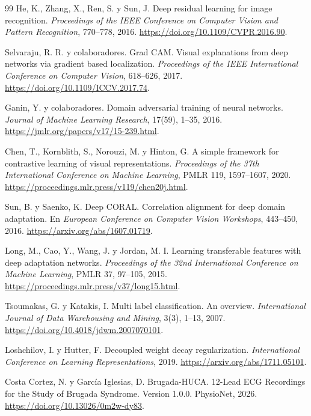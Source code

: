\begin{thebibliography}{99}
He, K., Zhang, X., Ren, S. y Sun, J.
\newblock Deep residual learning for image recognition.
\newblock \emph{Proceedings of the IEEE Conference on Computer Vision and Pattern Recognition}, 770--778, 2016.
\newblock \url{https://doi.org/10.1109/CVPR.2016.90}.

Selvaraju, R. R. y colaboradores.
\newblock Grad CAM. Visual explanations from deep networks via gradient based localization.
\newblock \emph{Proceedings of the IEEE International Conference on Computer Vision}, 618--626, 2017.
\newblock \url{https://doi.org/10.1109/ICCV.2017.74}.

Ganin, Y. y colaboradores.
\newblock Domain adversarial training of neural networks.
\newblock \emph{Journal of Machine Learning Research}, 17(59), 1--35, 2016.
\newblock \url{https://jmlr.org/papers/v17/15-239.html}.

Chen, T., Kornblith, S., Norouzi, M. y Hinton, G.
\newblock A simple framework for contrastive learning of visual representations.
\newblock \emph{Proceedings of the 37th International Conference on Machine Learning}, PMLR 119, 1597--1607, 2020.
\newblock \url{https://proceedings.mlr.press/v119/chen20j.html}.

Sun, B. y Saenko, K.
\newblock Deep CORAL. Correlation alignment for deep domain adaptation.
\newblock En \emph{European Conference on Computer Vision Workshops}, 443--450, 2016.
\newblock \url{https://arxiv.org/abs/1607.01719}.

Long, M., Cao, Y., Wang, J. y Jordan, M. I.
\newblock Learning transferable features with deep adaptation networks.
\newblock \emph{Proceedings of the 32nd International Conference on Machine Learning}, PMLR 37, 97--105, 2015.
\newblock \url{https://proceedings.mlr.press/v37/long15.html}.

Tsoumakas, G. y Katakis, I.
\newblock Multi label classification. An overview.
\newblock \emph{International Journal of Data Warehousing and Mining}, 3(3), 1--13, 2007.
\newblock \url{https://doi.org/10.4018/jdwm.2007070101}.

Loshchilov, I. y Hutter, F.
\newblock Decoupled weight decay regularization.
\newblock \emph{International Conference on Learning Representations}, 2019.
\newblock \url{https://arxiv.org/abs/1711.05101}.

Costa Cortez, N. y García Iglesias, D.
\newblock Brugada-HUCA. 12-Lead ECG Recordings for the Study of Brugada Syndrome. Version 1.0.0.
\newblock PhysioNet, 2026.
\newblock \url{https://doi.org/10.13026/0m2w-dy83}.


\end{thebibliography}
